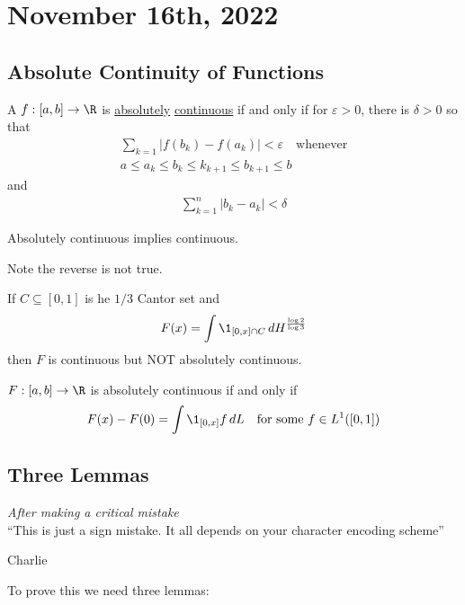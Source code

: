 \section{November 16th, 2022}

\subsection{Absolute Continuity of Functions}

\begin{theorem}
A $f : [a,b] \to \R$  is \underline{absolutely} \underline{continuous} if and only if for $\varepsilon > 0$, there is $\delta > 0$ so that
	\begin{align*}
		\sum_{k=1} | f (b_k) - f(a_k) | < \varepsilon \quad \text{whenever} \\
		a \leq a_k \leq b_k \leq k_{k+1} \leq b_{k+1} \leq b
	\end{align*} and
	\begin{align*}
		\sum_{k=1}^{n} | b_k - a_k | < \delta
	\end{align*}
\end{theorem}

\begin{lemma}
	Absolutely continuous implies continuous.
\end{lemma}

\begin{remark}
	Note the reverse is not true.
\end{remark}

\begin{example}
	If $C \subseteq [0,1]$ is he $1/3$ Cantor set and
	\begin{align*}
		F(x) = \int \1_{[0,x] \cap C} \, dH^{\frac{\log{2}}{\log{3}}}
	\end{align*} then $F$ is continuous but NOT absolutely continuous.
\end{example}

\begin{theorem}
	$F : [a,b] \to \R$ is absolutely continuous if and only if
	\begin{align*}
		F(x) - F(0) = \int \1_{[0,x]} f \, dL \quad \text{for some } f \in L^{1} ([0,1])
	\end{align*}
\end{theorem}

\subsection{Three Lemmas}
\epigraph{\textit{After making a critical mistake} \\ ``This is just a sign mistake. It all depends on your character encoding scheme''}{Charlie}
\noindent To prove this we need three lemmas:

